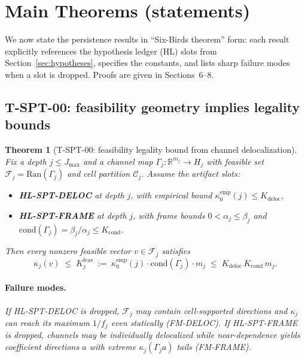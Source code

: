 \documentclass[11pt]{article}
\newcommand{\Ran}{\mathrm{Ran}}
\newtheorem{theorem}[definition]{Theorem}
\begin{document}
 \section{Main Theorems (statements)}\label{sec:main-theorems}

We now state the persistence results in ``Six-Birds theorem'' form: each result explicitly references the hypothesis ledger (HL) slots from Section~\ref{sec:hypotheses}, specifies the constants, and lists sharp failure modes when a slot is dropped.
Proofs are given in Sections~6--8.

\subsection{T-SPT-00: feasibility geometry implies legality bounds}

\begin{theorem}[T-SPT-00: feasibility legality bound from channel delocalization]\label{thm:t-spt-00}
Fix a depth $j\le J_{\max}$ and a channel map $\Gamma_j:\mathbb{R}^{m_j}\to H_j$ with feasible set $\mathcal{F}_j=\Ran(\Gamma_j)$ and cell partition $\mathcal{C}_j$.
Assume the artifact slots:
\begin{itemize}
\item \textbf{HL-SPT-DELOC} at depth $j$, with empirical bound $\kappa^{\mathrm{emp}}_0(j)\le K_{\mathrm{deloc}}$,
\item \textbf{HL-SPT-FRAME} at depth $j$, with frame bounds $0<\alpha_j\le \beta_j$ and $\mathrm{cond}(\Gamma_j)=\beta_j/\alpha_j\le K_{\mathrm{cond}}$.
\end{itemize}
Then every nonzero feasible vector $v\in\mathcal{F}_j$ satisfies
\begin{equation}\label{eq:t-spt-00-bound}
\kappa_j(v)
\;\le\;
K^{\mathrm{feas}}_j
\;:=\;
\kappa^{\mathrm{emp}}_0(j)\cdot \mathrm{cond}(\Gamma_j)\cdot m_j
\;\le\;
K_{\mathrm{deloc}}\,K_{\mathrm{cond}}\,m_j.
\end{equation}

\paragraph{Failure modes.}
If HL-SPT-DELOC is dropped, $\mathcal{F}_j$ may contain cell-supported directions and $\kappa_j$ can reach its maximum $1/f_j$ even statically (FM-DELOC).
If HL-SPT-FRAME is dropped, channels may be individually delocalized while near-dependence yields coefficient directions $a$ with extreme $\kappa_j(\Gamma_j a)$ tails (FM-FRAME).
\end{theorem}
\end{document}
